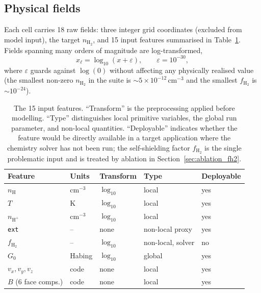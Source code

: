 \documentclass[fleqn,usenatbib]{rasti}
\newcommand{\nHH}{n_{\mathrm{H_2}}}
\newcommand{\Gzero}{G_0}
\newcommand{\fshield}{f_{\mathrm{H_2}}}
\begin{document}
\subsection{Physical fields}
\label{sec:fields}

Each cell carries 18 raw fields: three integer grid coordinates
(excluded from model input), the target \(\nHH\), and 15 input features
summarised in Table~\ref{tab:features}. Fields spanning many orders of
magnitude are log-transformed,
\begin{equation}
  x_\ell = \log_{10}(x + \varepsilon), \qquad \varepsilon = 10^{-30},
  \label{eq:logtransform}
\end{equation}
where \(\varepsilon\) guards against \(\log(0)\) without affecting any
physically realised value (the smallest non-zero \(\nHH\) in the suite is
\(\sim\)\(5\times10^{-12}\)\,cm\(^{-3}\) and the smallest \(\fshield\) is
\(\sim\)\(10^{-24}\)).

\begin{table}
\centering
\caption{The 15 input features. ``Transform'' is the preprocessing
applied before modelling. ``Type'' distinguishes local primitive
variables, the global run parameter, and non-local quantities.
``Deployable'' indicates whether the feature would be directly available
in a target application where the chemistry solver has not been run;
the self-shielding factor \(\fshield\) is the single problematic input and
is treated by ablation in Section~\ref{sec:ablation_fh2}.}
\label{tab:features}
\small
\setlength{\tabcolsep}{4pt}
\begin{tabular}{lllll}
\hline
Feature & Units & Transform & Type & Deployable \\
\hline
\(n_{\mathrm{H}}\)       & cm\(^{-3}\) & \(\log_{10}\) & local & yes \\
\(T\)                    & K         & \(\log_{10}\) & local & yes \\
\(n_{\mathrm{H^+}}\)     & cm\(^{-3}\) & \(\log_{10}\) & local & yes \\
\texttt{ext}           & --        & none        & non-local proxy & yes \\
\(\fshield\)             & --        & \(\log_{10}\) & non-local, solver & no \\
\(\Gzero\)               & Habing    & \(\log_{10}\) & global  & yes \\
\(v_x, v_y, v_z\)        & code      & none        & local & yes \\
\(B\) (6 face comps.)    & code      & none        & local & yes \\
\hline
\end{tabular}
\end{table}
\end{document}
